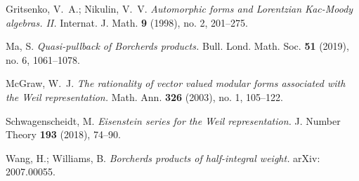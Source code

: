 \documentclass[12pt]{amsart}
\numberwithin{equation}{section}
\theoremstyle{definition}
\theoremstyle{remark}
\begin{document}
\begin{thebibliography}{99}
Gritsenko, V.~A.; Nikulin, V.~V. 
\textit{Automorphic forms and Lorentzian Kac-Moody algebras. II.}  
Internat. J. Math. \textbf{9} (1998), no. 2, 201--275. 

Ma, S. 
\textit{Quasi-pullback of Borcherds products.}  
Bull. Lond. Math. Soc. \textbf{51} (2019), no. 6, 1061--1078. 

McGraw, W.~J. 
\textit{The rationality of vector valued modular forms associated with the Weil representation.}  
Math. Ann. \textbf{326} (2003), no. 1, 105--122. 

Schwagenscheidt, M. 
\textit{Eisenstein series for the Weil representation.} 
J. Number Theory \textbf{193} (2018), 74--90. 

Wang, H.; Williams, B. 
\textit{Borcherds products of half-integral weight.}
arXiv: 2007.00055. 

\end{thebibliography}
\end{document}
